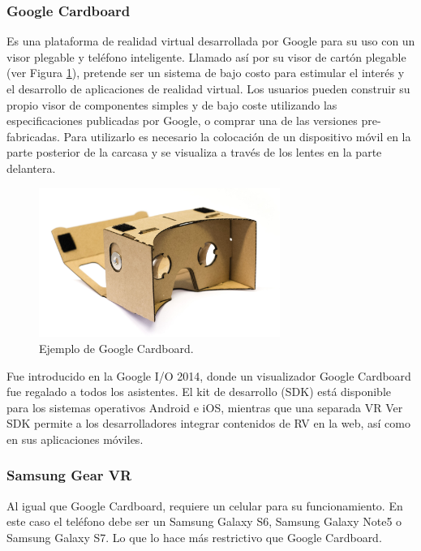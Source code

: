 \documentclass[12pt]{article}
\begin{document}
\subsubsection{Google Cardboard}
\noindent Es una plataforma de realidad virtual desarrollada por Google\cite{cardboard} para su uso con un visor plegable y teléfono inteligente. Llamado así por su visor de cartón plegable (ver Figura \ref{card}), pretende ser un sistema de bajo costo para estimular el interés y el desarrollo de aplicaciones de realidad virtual. Los usuarios pueden construir su propio visor de componentes simples y de bajo coste utilizando las especificaciones publicadas por Google, o comprar una de las versiones pre-fabricadas. Para utilizarlo es necesario  la colocación de un dispositivo móvil en la parte posterior de la carcasa y se  visualiza a través de los lentes en la parte delantera.
\begin{figure}[h!]
\includegraphics[width=0.7\textwidth,center]{google_cardboard.jpg}
\caption{Ejemplo de Google Cardboard.}
\label{card}
\end{figure}

Fue introducido en la Google I/O 2014, donde un visualizador Google Cardboard fue regalado a todos los asistentes. El kit de desarrollo (SDK) está disponible para los sistemas operativos Android e iOS, mientras que una separada VR Ver SDK permite a los desarrolladores integrar contenidos de RV en la web, así como en sus aplicaciones móviles. 
\subsubsection{Samsung Gear VR}
\noindent Al igual que Google Cardboard, requiere un celular para su funcionamiento. En este caso el teléfono debe ser un Samsung Galaxy S6, Samsung Galaxy Note5 o Samsung Galaxy S7\cite{samsungvr}. Lo que lo hace más restrictivo que Google Cardboard.
\end{document}
